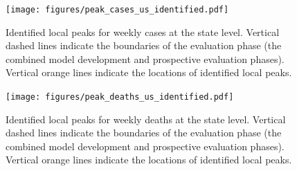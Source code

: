 \documentclass{article}
\begin{document}
\begin{figure}
  \texttt{[image: figures/peak\_cases\_us\_identified.pdf]}
  \caption{Identified local peaks for weekly cases at the state level. Vertical dashed lines indicate the boundaries of the evaluation phase (the combined model development and prospective evaluation phases). Vertical orange lines indicate the locations of identified local peaks.}
  \label{fig:peak_cases_us_identified}
\end{figure}

\begin{figure}
  \texttt{[image: figures/peak\_deaths\_us\_identified.pdf]}
  \caption{Identified local peaks for weekly deaths at the state level. Vertical dashed lines indicate the boundaries of the evaluation phase (the combined model development and prospective evaluation phases). Vertical orange lines indicate the locations of identified local peaks.}
  \label{fig:peak_deaths_us_identified}
\end{figure}
\end{document}
